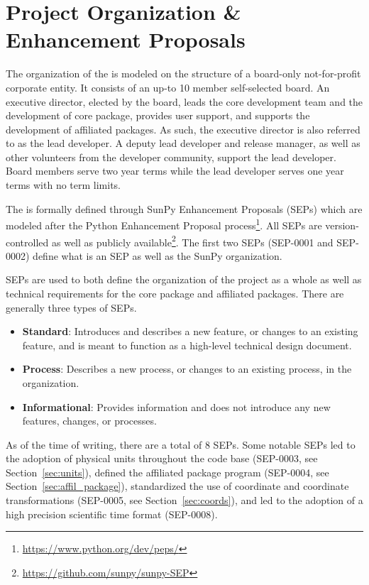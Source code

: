 \section{Project Organization \& Enhancement Proposals}
\label{sec:proj_org}

The organization of the \sunpyproj is modeled on the structure of a board-only not-for-profit corporate entity.
It consists of an up-to 10 member self-selected board.
An executive director, elected by the board, leads the core development team and the development of \sunpypkg core package, provides user support, and supports the development of affiliated packages.
As such, the executive director is also referred to as the lead developer.
A deputy lead developer and release manager, as well as other volunteers from the developer community, support the lead developer.
Board members serve two year terms while the lead developer serves one year terms with no term limits.

The \sunpyproj is formally defined through SunPy Enhancement Proposals (SEPs) which are modeled after the Python Enhancement Proposal process\footnote{\url{https://www.python.org/dev/peps/}}.
All SEPs are version-controlled as well as publicly available\footnote{\url{https://github.com/sunpy/sunpy-SEP}}.
The first two SEPs (SEP-0001 and SEP-0002) define what is an SEP as well as the SunPy organization.

SEPs are used to both define the organization of the project as a whole as well as technical requirements for the \sunpypkg core package and affiliated packages.
There are generally three types of SEPs.
\begin{itemize}
    \item \textbf{Standard}: Introduces and describes a new feature, or changes to an existing feature, and is meant to function as a high-level technical design document.
    \item \textbf{Process}: Describes a new process, or changes to an existing process, in the organization.
    \item \textbf{Informational}: Provides information and does not introduce any new features, changes, or processes.
\end{itemize}

As of the time of writing, there are a total of 8 SEPs.
Some notable SEPs led to the adoption of physical units throughout the code base (SEP-0003, see Section~\ref{sec:units}), defined the affiliated package program (SEP-0004, see Section~\ref{sec:affil_package}), standardized the use of coordinate and coordinate transformations (SEP-0005, see Section~\ref{sec:coords}), and led to the adoption of a high precision scientific time format (SEP-0008).

